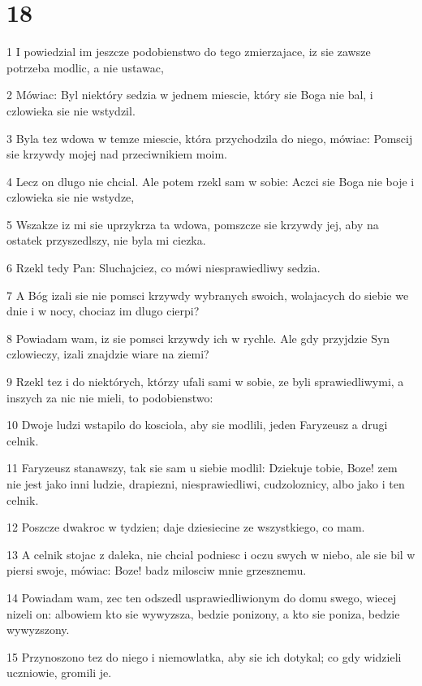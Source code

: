 \chapter{18}

\par 1 I powiedzial im jeszcze podobienstwo do tego zmierzajace, iz sie zawsze potrzeba modlic, a nie ustawac,
\par 2 Mówiac: Byl niektóry sedzia w jednem miescie, który sie Boga nie bal, i czlowieka sie nie wstydzil.
\par 3 Byla tez wdowa w temze miescie, która przychodzila do niego, mówiac: Pomscij sie krzywdy mojej nad przeciwnikiem moim.
\par 4 Lecz on dlugo nie chcial. Ale potem rzekl sam w sobie: Aczci sie Boga nie boje i czlowieka sie nie wstydze,
\par 5 Wszakze iz mi sie uprzykrza ta wdowa, pomszcze sie krzywdy jej, aby na ostatek przyszedlszy, nie byla mi ciezka.
\par 6 Rzekl tedy Pan: Sluchajciez, co mówi niesprawiedliwy sedzia.
\par 7 A Bóg izali sie nie pomsci krzywdy wybranych swoich, wolajacych do siebie we dnie i w nocy, chociaz im dlugo cierpi?
\par 8 Powiadam wam, iz sie pomsci krzywdy ich w rychle. Ale gdy przyjdzie Syn czlowieczy, izali znajdzie wiare na ziemi?
\par 9 Rzekl tez i do niektórych, którzy ufali sami w sobie, ze byli sprawiedliwymi, a inszych za nic nie mieli, to podobienstwo:
\par 10 Dwoje ludzi wstapilo do kosciola, aby sie modlili, jeden Faryzeusz a drugi celnik.
\par 11 Faryzeusz stanawszy, tak sie sam u siebie modlil: Dziekuje tobie, Boze! zem nie jest jako inni ludzie, drapiezni, niesprawiedliwi, cudzoloznicy, albo jako i ten celnik.
\par 12 Poszcze dwakroc w tydzien; daje dziesiecine ze wszystkiego, co mam.
\par 13 A celnik stojac z daleka, nie chcial podniesc i oczu swych w niebo, ale sie bil w piersi swoje, mówiac: Boze! badz milosciw mnie grzesznemu.
\par 14 Powiadam wam, zec ten odszedl usprawiedliwionym do domu swego, wiecej nizeli on: albowiem kto sie wywyzsza, bedzie ponizony, a kto sie poniza, bedzie wywyzszony.
\par 15 Przynoszono tez do niego i niemowlatka, aby sie ich dotykal; co gdy widzieli uczniowie, gromili je.
